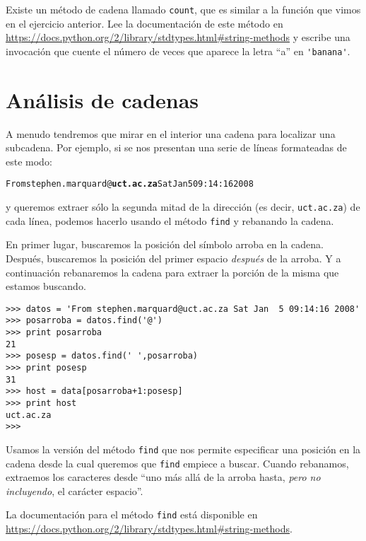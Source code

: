 \begin{ex}

Existe un método de cadena llamado {\tt count}, que es similar a la función
que vimos en el ejercicio anterior. Lee la documentación
de este método en
\url{https://docs.python.org/2/library/stdtypes.html#string-methods}
y escribe una invocación que cuente el número de veces que
aparece la letra ``a''
en \verb"'banana'".
\end{ex}

\section{Análisis de cadenas}

A menudo tendremos que mirar en el interior una cadena para localizar una subcadena. Por
ejemplo, si se nos presentan una serie de líneas formateadas de este modo:

\beforeverb
\begin{alltt}
From stephen.marquard@{\bf uct.ac.za} Sat Jan  5 09:14:16 2008
\end{alltt}
\afterverb

y queremos extraer sólo la segunda mitad de la dirección (es decir,
{\tt uct.ac.za}) de cada línea, podemos hacerlo usando el método
{\tt find} y rebanando la cadena.

En primer lugar, buscaremos la posición del símbolo arroba en la cadena. Después,
buscaremos la posición del primer espacio \emph{después} de la arroba. Y a continuación
rebanaremos la cadena para extraer la porción de la misma que estamos
buscando.

\beforeverb
\begin{verbatim}
>>> datos = 'From stephen.marquard@uct.ac.za Sat Jan  5 09:14:16 2008'
>>> posarroba = datos.find('@')
>>> print posarroba
21
>>> posesp = datos.find(' ',posarroba)
>>> print posesp
31
>>> host = data[posarroba+1:posesp]
>>> print host
uct.ac.za
>>> 
\end{verbatim}
\afterverb
%
Usamos la versión del método {\tt find} que nos permite especificar
una posición en la cadena desde la cual queremos que {\tt find} empiece a buscar.
Cuando rebanamos, extraemos los caracteres
desde ``uno más allá de la arroba hasta, \emph{pero no incluyendo}, el
carácter espacio''.

La documentación para el método {\tt find} está disponible en 
\url{https://docs.python.org/2/library/stdtypes.html#string-methods}.


